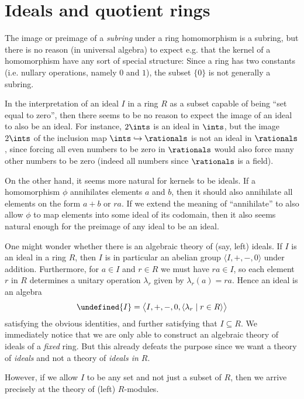 \documentclass[article, a4paper, 11pt, oneside]{memoir}
\let\mathfrak\undefined
\numberwithin{equation}{chapter}
\theoremstyle{nonumberplain}
\begin{document}
\section{Ideals and quotient rings}

\begin{remarkbreak}
    The image or preimage of a \emph{subring} under a ring homomorphism is a subring, but there is no reason (in universal algebra) to expect e.g. that the kernel of a homomorphism have any sort of special structure: Since a ring has two constants (i.e. nullary operations, namely $0$ and $1$), the subset $\{0\}$ is not generally a subring.

    In the interpretation of an ideal $I$ in a ring $R$ as a subset capable of being \enquote{set equal to zero}, then there seems to be no reason to expect the image of an ideal to also be an ideal. For instance, $2\ints$ is an ideal in $\ints$, but the image $2\ints$ of the inclusion map $\ints \hookrightarrow \rationals$ is not an ideal in $\rationals$, since forcing all even numbers to be zero in $\rationals$ would also force many other numbers to be zero (indeed all numbers since $\rationals$ is a field).

    On the other hand, it seems more natural for kernels to be ideals. If a homomorphism $\phi$ annihilates elements $a$ and $b$, then it should also annihilate all elements on the form $a + b$ or $ra$. If we extend the meaning of \enquote{annihilate} to also allow $\phi$ to map elements into some ideal of its codomain, then it also seems natural enough for the preimage of any ideal to be an ideal.
\end{remarkbreak}


\begin{remarkbreak}
    One might wonder whether there is an algebraic theory of (say, left) ideals. If $I$ is an ideal in a ring $R$, then $I$ is in particular an abelian group $\langle I, +, -, 0 \rangle$ under addition. Furthermore, for $a \in I$ and $r \in R$ we must have $ra \in I$, so each element $r$ in $R$ determines a unitary operation $\lambda_r$ given by $\lambda_r(a) = ra$. Hence an ideal is an algebra
    \begin{equation*}
        \mathfrak{I}
            = \bigl\langle I, +, -, 0, \langle \lambda_r \mid r \in R \rangle \bigr\rangle
    \end{equation*}
    satisfying the obvious identities, and further satisfying that $I \subseteq R$. We immediately notice that we are only able to construct an algebraic theory of ideals of a \emph{fixed} ring. But this already defeats the purpose since we want a theory of \emph{ideals} and not a theory of \emph{ideals in $R$}.

    However, if we allow $I$ to be any set and not just a subset of $R$, then we arrive precisely at the theory of (left) $R$-modules.
\end{remarkbreak}
\end{document}
